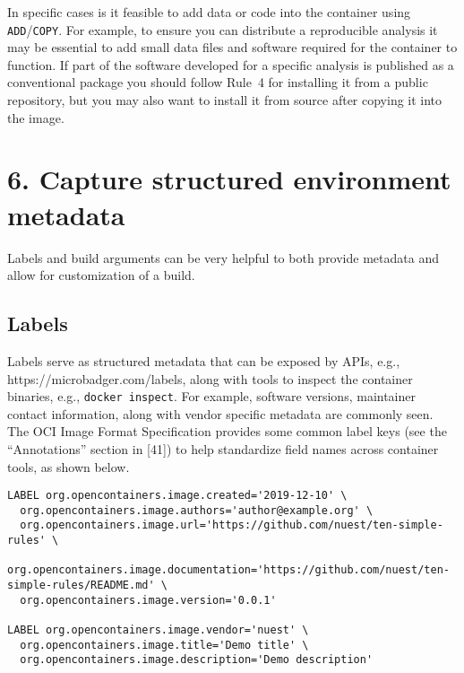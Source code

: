\documentclass[10pt,letterpaper]{article}
\begin{document}
In specific cases is it feasible to add data or code into the container
using \texttt{ADD}/\texttt{COPY}. For example, to ensure you can
distribute a reproducible analysis it may be essential to add small data
files and software required for the container to function. If part of
the software developed for a specific analysis is published as a
conventional package you should follow Rule~4 for installing it from a
public repository, but you may also want to install it from source after
copying it into the image.

\hypertarget{capture-structured-environment-metadata}{%
\section*{6. Capture structured environment
metadata}\label{capture-structured-environment-metadata}}

Labels and build arguments can be very helpful to both provide metadata
and allow for customization of a build.

\hypertarget{labels}{%
\subsection{Labels}\label{labels}}

Labels serve as structured metadata that can be exposed by APIs, e.g.,
https://microbadger.com/labels, along with tools to inspect the
container binaries, e.g., \texttt{docker\ inspect}. For example,
software versions, maintainer contact information, along with vendor
specific metadata are commonly seen. The OCI Image Format Specification
provides some common label keys (see the ``Annotations'' section in
{[}41{]}) to help standardize field names across container tools, as
shown below.

\begin{verbatim}
LABEL org.opencontainers.image.created='2019-12-10' \
  org.opencontainers.image.authors='author@example.org' \
  org.opencontainers.image.url='https://github.com/nuest/ten-simple-rules' \
  org.opencontainers.image.documentation='https://github.com/nuest/ten-simple-rules/README.md' \
  org.opencontainers.image.version='0.0.1'

LABEL org.opencontainers.image.vendor='nuest' \
  org.opencontainers.image.title='Demo title' \
  org.opencontainers.image.description='Demo description'
\end{verbatim}
\end{document}
